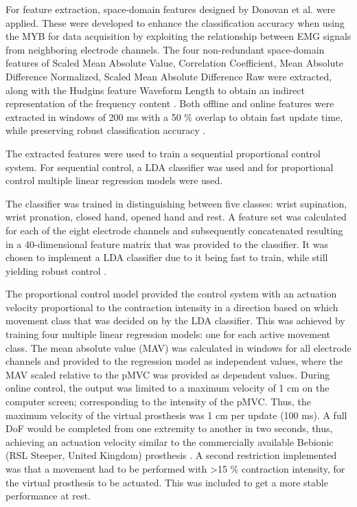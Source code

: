 For feature extraction, space-domain features designed by Donovan et al. \cite{Donovan2017} were applied. These were developed to enhance the classification accuracy when using the MYB for data acquisition by exploiting the relationship between EMG signals from neighboring electrode channels. The four non-redundant space-domain features of Scaled Mean Absolute Value, Correlation Coefficient, Mean Absolute Difference Normalized, Scaled Mean Absolute Difference Raw were extracted, along with the Hudgins feature Waveform Length to obtain an indirect representation of the frequency content \cite{Hudgins1993}. Both offline and online features were extracted in windows of 200 ms with a 50 $\%$ overlap to obtain fast update time, while preserving robust classification accuracy \cite{Menon2017}.

The extracted features were used to train a sequential proportional control system. For sequential control, a LDA classifier was used and for proportional control multiple linear regression models were used.

The classifier was trained in distinguishing between five classes: wrist supination, wrist pronation, closed hand, opened hand and rest. A feature set was calculated for each of the eight electrode channels and subsequently concatenated resulting in a 40-dimensional feature matrix that was provided to the classifier. It was chosen to implement a LDA classifier due to it being fast to train, while still yielding robust control \cite{Englehart2003}.  

The proportional control model provided the control system with an actuation velocity proportional to the contraction intensity in a direction based on which movement class that was decided on by the LDA classifier. This was achieved by training four multiple linear regression models: one for each active movement class. The mean absolute value (MAV) was calculated in windows for all electrode channels and provided to the regression model as independent values, where the MAV scaled relative to the pMVC was provided as dependent values. During online control, the output was limited to a maximum velocity of 1 cm on the computer screen; corresponding to the intensity of the pMVC. Thus, the maximum velocity of the virtual prosthesis was 1 cm per update (100 ms). A full DoF would be completed from one extremity to another in two seconds, thus, achieving an actuation velocity similar to the commercially available Bebionic (RSL Steeper, United Kingdom) prosthesis \cite{Belter2013}. A second restriction implemented was that a movement had to be performed with >15 $\%$ contraction intensity, for the virtual prosthesis to be actuated. This was included to get a more stable performance at rest. 